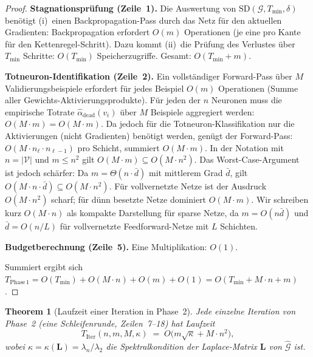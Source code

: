 ﻿\documentclass[12pt, a4paper, openany]{report}
\newtheorem{theorem}{Theorem}[chapter]
\newcommand{\calG}{\mathcal{G}}
\newcommand{\calV}{\mathcal{V}}
\begin{document}
\begin{proof}
\textbf{Stagnationsprüfung (Zeile~1).}
Die Auswertung von $\mathrm{SD}(\calG, T_{\min}, \delta)$ benötigt
(i)~einen Backpropagation-Pass durch das Netz für den aktuellen Gradienten:
Backpropagation erfordert $O(m)$ Operationen (je eine pro Kante für
den Kettenregel-Schritt).  Dazu kommt (ii)~die Prüfung des Verlustes über
$T_{\min}$ Schritte: $O(T_{\min})$ Speicherzugriffe.
Gesamt: $O(T_{\min} + m)$.

\textbf{Totneuron-Identifikation (Zeile~2).}
Ein vollständiger Forward-Pass über $M$ Validierungsbeispiele erfordert
für jedes Beispiel $O(m)$ Operationen (Summe aller Gewichts-Aktivierungsprodukte).
Für jeden der $n$ Neuronen muss die empirische Totrate
$\hat{\alpha}_{\mathrm{dead}}(v_i)$ über $M$ Beispiele aggregiert werden:
$O(M \cdot m) = O(M \cdot m)$.
Da jedoch für die Totneuron-Klassifikation nur die Aktivierungen
(nicht Gradienten) benötigt werden, genügt der Forward-Pass:
$O(M \cdot n_\ell \cdot n_{\ell-1})$ pro Schicht, summiert $O(M \cdot m)$.
In der Notation mit $n = |\calV|$ und $m \leq n^2$ gilt
$O(M \cdot m) \subseteq O(M \cdot n^2)$.
Das Worst-Case-Argument ist jedoch schärfer: Da $m = \Theta(n \cdot \bar{d})$
mit mittlerem Grad $\bar{d}$, gilt $O(M \cdot n \cdot \bar{d}) \subseteq O(M \cdot n^2)$.
Für vollvernetzte Netze ist der Ausdruck $O(M \cdot n^2)$
scharf; für dünn besetzte Netze dominiert $O(M \cdot m)$.  Wir schreiben
kurz $O(M \cdot n)$ als kompakte Darstellung für sparse Netze, da
$m = O(n \bar d)$ und $\bar d = O(n/L)$ für vollvernetzte Feedforward-Netze
mit $L$ Schichten.

\textbf{Budgetberechnung (Zeile~5).}
Eine Multiplikation: $O(1)$.

Summiert ergibt sich $T_{\mathrm{Phase\,1}} = O(T_{\min}) + O(M \cdot n) + O(m) + O(1)
= O(T_{\min} + M \cdot n + m)$.
\end{proof}

\begin{theorem}[Laufzeit einer Iteration in Phase~2]
\label{thm:runtime_phase2_iter}
Jede einzelne Iteration von Phase~2 (eine Schleifenrunde, Zeilen~7--18)
hat Laufzeit
\begin{equation}
  \label{eq:runtime_iteration}
  T_{\mathrm{Iter}}(n, m, M, \kappa)
  \;=\;
  O\!\bigl(m \sqrt{\kappa} + M \cdot n^2\bigr),
\end{equation}
wobei $\kappa = \kappa(\bm{L}) = \lambda_n / \lambda_2$ die
Spektralkondition der Laplace-Matrix $\bm{L}$ von $\hat{\calG}$ ist.
\end{theorem}
\end{document}
